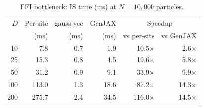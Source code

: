 \begin{table}[t]
\centering
\caption{FFI bottleneck: IS time (ms) at $N\!=\!10{,}000$ particles.}
\label{tab:ffi-speedup}
\begin{tabular}{r r r r r r}
\toprule
$D$ & Per-site & gauss-vec & GenJAX & \multicolumn{2}{c}{Speedup} \\
    &  (ms)    &  (ms)     & (ms)   & vs per-site & vs GenJAX \\
\midrule
10 & 7.8 & 0.7 & 1.9 & 10.5$\times$ & 2.6$\times$ \\
25 & 15.3 & 0.8 & 4.5 & 19.6$\times$ & 5.8$\times$ \\
50 & 31.2 & 0.9 & 9.1 & 33.9$\times$ & 9.9$\times$ \\
100 & 113.0 & 1.3 & 18.6 & 87.2$\times$ & 14.3$\times$ \\
200 & 275.7 & 2.4 & 34.5 & 116.0$\times$ & 14.5$\times$ \\
\bottomrule
\end{tabular}
\end{table}
